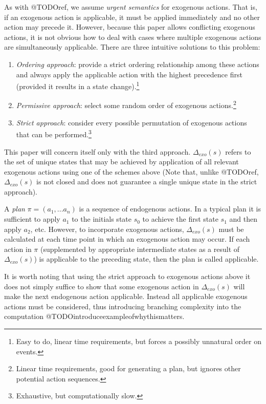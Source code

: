 \documentclass{article}
\theoremstyle{plain}
\theoremstyle{definition}
\begin{document}
As with @TODOref, we assume \textit{urgent semantics} for exogenous actions. That is, if an exogenous action is applicable, it must be applied immediately and no other action may precede it. However, because this paper allows conflicting exogenous actions, it is not obvious how to deal with cases where multiple exogenous actions are simultaneously applicable. There are three intuitive solutions to this problem:
\begin{enumerate}
\item \textit{Ordering approach}: provide a strict ordering relationship among these actions and always apply the applicable action with the highest precedence first (provided it results in a state change).\footnote{Easy to do, linear time requirements, but forces a possibly unnatural order on events.}
\item \textit{Permissive approach}: select some random order of exogenous actions.\footnote{Linear time requirements, good for generating a plan, but ignores other potential action sequences.}
\item \textit{Strict approach}: consider every possible permutation of exogenous actions that can be performed.\footnote{Exhaustive, but computationally slow.}
\end{enumerate}

This paper will concern itself only with the third approach. $\Delta_{exo}(s)$ refers to the set of unique states that may be achieved by application of all relevant exogenous actions using one of the schemes above (Note that, unlike @TODOref, $\Delta_{exo}(s)$ is not closed and does not guarantee a single unique state in the strict approach).

A \textit{plan} $\pi=(a_1,...a_n)$ is a sequence of endogenous actions. In a typical plan it is sufficient to apply $a_1$ to the initials state $s_0$ to achieve the first state $s_1$ and then apply $a_2$, etc. However, to incorporate exogenous actions, $\Delta_{exo}(s)$ must be calculated at each time point in which an exogenous action may occur. If each action in $\pi$ (supplemented by appropriate intermediate states as a result of $\Delta_{exo}(s)$) is applicable to the preceding state, then the plan is called applicable. 

It is worth noting that using the strict approach to exogenous actions above it does not simply suffice to show that some exogenous action in $\Delta_{exo}(s)$ will make the next endogenous action applicable. Instead all applicable exogenous actions must be considered, thus introducing branching complexity into the computation @TODOintroduceexampleofwhythismatters.
\end{document}

